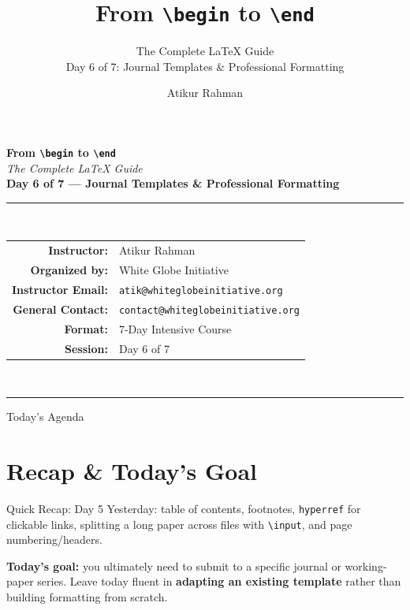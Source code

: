\documentclass[11pt,aspectratio=169,table]{beamer}
\title[\texttt{\textbackslash begin} to \texttt{\textbackslash end}]{From \texttt{\textbackslash begin} to \texttt{\textbackslash end}}
\subtitle{The Complete LaTeX Guide \\[2pt] \normalsize Day 6 of 7: Journal Templates \& Professional Formatting}
\author[A.\ Rahman]{Atikur Rahman}
\institute[White Globe Initiative]{White Globe Initiative}
\begin{document}
\begin{frame}[plain]
  \begin{center}
    \vspace{4pt}
    {\Huge\bfseries{}From \texttt{\textbackslash begin} to \texttt{\textbackslash end}}\\[6pt]
    {\Large\itshape The Complete LaTeX Guide}\\[18pt]
    {\large\bfseries Day 6 of 7 --- Journal Templates \& Professional Formatting}\\[22pt]
    \rule{0.7\textwidth}{0.4pt}\\[14pt]
    \begin{tabular}{rl}
      \textbf{Instructor:}       & Atikur Rahman \\[3pt]
      \textbf{Organized by:}     & White Globe Initiative \\[3pt]
      \textbf{Instructor Email:} & \texttt{atik@whiteglobeinitiative.org} \\[3pt]
      \textbf{General Contact:}  & \texttt{contact@whiteglobeinitiative.org} \\[3pt]
      \textbf{Format:}           & 7-Day Intensive Course \\[3pt]
      \textbf{Session:}          & Day 6 of 7 \\
    \end{tabular}\\[18pt]
    \rule{0.7\textwidth}{0.4pt}
  \end{center}
\end{frame}

\begin{frame}{Today's Agenda}
  \tableofcontents
\end{frame}

\section{Recap \& Today's Goal}

\begin{frame}{Quick Recap: Day 5}
  \small
  Yesterday: table of contents, footnotes, \texttt{hyperref} for
  clickable links, splitting a long paper across files with
  \texttt{\textbackslash input}, and page numbering/headers.
  \vspace{6pt}

  \textbf{Today's goal:} you ultimately need to submit to a specific
  journal or working-paper series. Leave today fluent in
  \textbf{adapting an existing template} rather than building
  formatting from scratch.
\end{frame}
\end{document}
